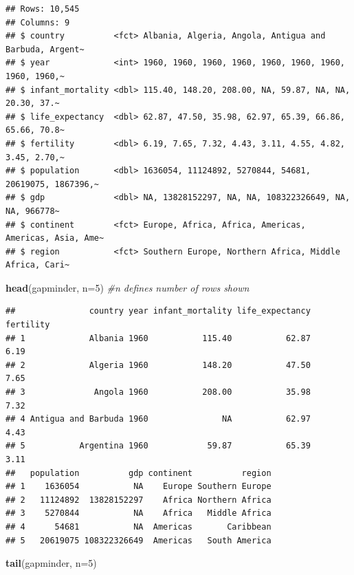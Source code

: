 \documentclass[
]{book}
\newenvironment{Shaded}{\begin{snugshade}}{\end{snugshade}}
\newcommand{\CommentTok}[1]{\textcolor[rgb]{0.56,0.35,0.01}{\textit{#1}}}
\newcommand{\DataTypeTok}[1]{\textcolor[rgb]{0.13,0.29,0.53}{#1}}
\newcommand{\DecValTok}[1]{\textcolor[rgb]{0.00,0.00,0.81}{#1}}
\newcommand{\KeywordTok}[1]{\textcolor[rgb]{0.13,0.29,0.53}{\textbf{#1}}}
\newcommand{\NormalTok}[1]{#1}
\begin{document}
\begin{verbatim}
## Rows: 10,545
## Columns: 9
## $ country          <fct> Albania, Algeria, Angola, Antigua and Barbuda, Argent~
## $ year             <int> 1960, 1960, 1960, 1960, 1960, 1960, 1960, 1960, 1960,~
## $ infant_mortality <dbl> 115.40, 148.20, 208.00, NA, 59.87, NA, NA, 20.30, 37.~
## $ life_expectancy  <dbl> 62.87, 47.50, 35.98, 62.97, 65.39, 66.86, 65.66, 70.8~
## $ fertility        <dbl> 6.19, 7.65, 7.32, 4.43, 3.11, 4.55, 4.82, 3.45, 2.70,~
## $ population       <dbl> 1636054, 11124892, 5270844, 54681, 20619075, 1867396,~
## $ gdp              <dbl> NA, 13828152297, NA, NA, 108322326649, NA, NA, 966778~
## $ continent        <fct> Europe, Africa, Africa, Americas, Americas, Asia, Ame~
## $ region           <fct> Southern Europe, Northern Africa, Middle Africa, Cari~
\end{verbatim}

\begin{Shaded}
\begin{Highlighting}[]
\KeywordTok{head}\NormalTok{(gapminder, }\DataTypeTok{n=}\DecValTok{5}\NormalTok{) }\CommentTok{#n defines number of rows shown}
\end{Highlighting}
\end{Shaded}

\begin{verbatim}
##               country year infant_mortality life_expectancy fertility
## 1             Albania 1960           115.40           62.87      6.19
## 2             Algeria 1960           148.20           47.50      7.65
## 3              Angola 1960           208.00           35.98      7.32
## 4 Antigua and Barbuda 1960               NA           62.97      4.43
## 5           Argentina 1960            59.87           65.39      3.11
##   population          gdp continent          region
## 1    1636054           NA    Europe Southern Europe
## 2   11124892  13828152297    Africa Northern Africa
## 3    5270844           NA    Africa   Middle Africa
## 4      54681           NA  Americas       Caribbean
## 5   20619075 108322326649  Americas   South America
\end{verbatim}

\begin{Shaded}
\begin{Highlighting}[]
\KeywordTok{tail}\NormalTok{(gapminder, }\DataTypeTok{n=}\DecValTok{5}\NormalTok{)}
\end{Highlighting}
\end{Shaded}
\end{document}

